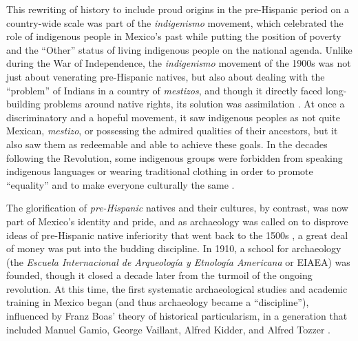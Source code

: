 This rewriting of history to include proud origins in the pre-Hispanic period on a country-wide scale was part of the \textit{indigenismo} movement, which celebrated the role of indigenous people in Mexico’s past while putting the position of poverty and the “Other” status of living indigenous people on the national agenda. Unlike during the War of Independence, the \textit{indigenismo} movement of the 1900s was not just about venerating pre-Hispanic natives, but also about dealing with the “problem” of Indians in a country of \textit{mestizos}, and though it directly faced long-building problems around native rights, its solution was assimilation \parencite[60]{Ortiz1996}. 
At once a discriminatory and a hopeful movement, it saw indigenous peoples as not quite Mexican, \textit{mestizo}, or possessing the admired qualities of their ancestors, but it also saw them as redeemable and able to achieve these goals. In the decades following the Revolution, some indigenous groups were forbidden from speaking indigenous languages or wearing traditional clothing in order to promote “equality” and to make everyone culturally the same \parencite[91,97]{Hernandez2002}.

The glorification of \textit{pre-Hispanic} natives and their cultures, by contrast, was now part of Mexico’s identity and pride, and as archaeology was called on to disprove ideas of pre-Hispanic native inferiority that went back to the 1500s \parencite[95]{Swarthout2004}, a great deal of money was put into the budding discipline. 
In 1910, a school for archaeology (the \textit{Escuela Internacional de Arqueología y Etnología Americana} or EIAEA) was founded, though it closed a decade later from the turmoil of the ongoing revolution. At this time, the first systematic archaeological studies and academic training in Mexico began (and thus archaeology became a “discipline”), influenced by Franz Boas’ theory of historical particularism, in a generation that included Manuel Gamio, George Vaillant, Alfred Kidder, and Alfred Tozzer \parencites[330]{Caballero2008}[234]{Fowler1987}[277]{Trigger2006}.

